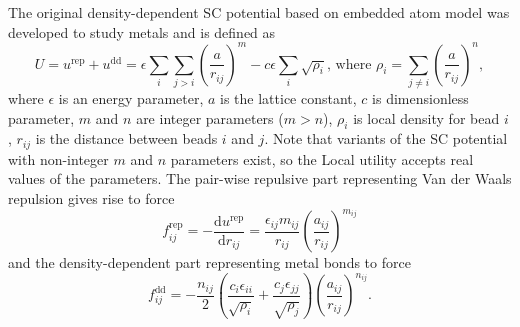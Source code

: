 The original density-dependent SC potential based on embedded atom model was
developed to study metals\cite{sutton1990} and is defined as
\begin{equation}\label{eq:SuttonChen}
  U = u^\text{rep} + u^\text{dd} = \epsilon\sum_i\sum_{j>i}
    \left(\frac{a}{r_{ij}}\right)^m-c\epsilon\sum_i\sqrt{\rho_i}
    \mbox{, where }
    \rho_i=\sum_{j\neq i}\left(\frac{a}{r_{ij}}\right)^n,
\end{equation}
where $\epsilon$ is an energy parameter, $a$ is the lattice constant, $c$ is
dimensionless parameter, $m$ and $n$ are integer parameters ($m>n$), $\rho_i$ is
local density for bead $i$, $r_{ij}$ is the distance between beads $i$ and $j$.
Note that variants of the SC potential with non-integer $m$ and $n$ parameters
exist, so the Local utility accepts real values of the parameters.
The pair-wise repulsive part representing Van der Waals repulsion gives rise to
force
\begin{equation}\label{eq:SCfrep}
f^\text{rep}_{ij} = -\frac{\text{d}u^\text{rep}}{\text{d}r_{ij}} =
  \frac{\epsilon_{ij}m_{ij}}{r_{ij}}\left(\frac{a_{ij}}{r_{ij}}\right)^{m_{ij}}
\end{equation}
and the density-dependent part representing metal bonds to force
\begin{equation}\label{eq:SCfdd}
f^\text{dd}_{ij} = -\frac{n_{ij}}{2}
  \left(\frac{c_i\epsilon_{ii}}{\sqrt{\rho_i}}+
        \frac{c_j\epsilon_{jj}}{\sqrt{\rho_j}}\right)
  \left(\frac{a_{ij}}{r_{ij}}\right)^{n_{ij}}.
\end{equation}

